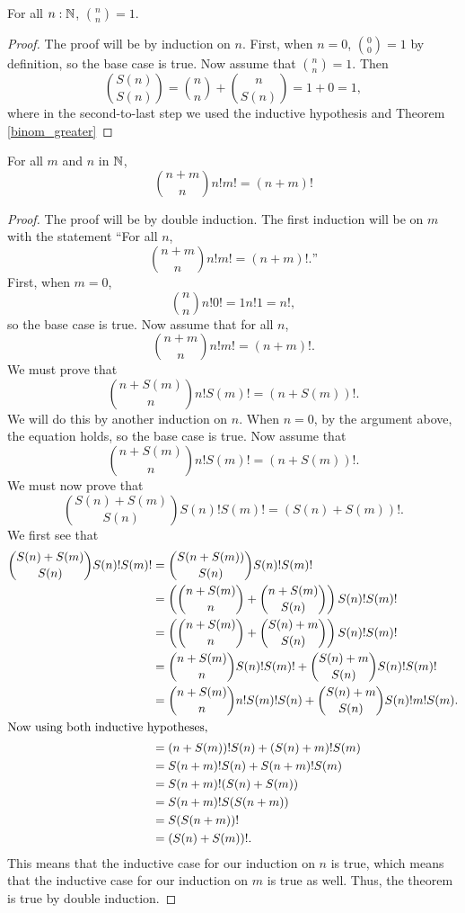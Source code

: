 \documentclass[../../math.tex]{subfiles}
\begin{document}
\begin{theorem}
    For all $n : \mathbb{N}$, $\displaystyle \binom{n}{n} = 1$.
\end{theorem}
\begin{proof}
    The proof will be by induction on $n$.  First, when $n = 0$, $\binom{0}{0} =
    1$ by definition, so the base case is true.  Now assume that $\binom{n}{n} =
    1$.  Then
    \[
        \binom{S(n)}{S(n)} = \binom{n}{n} + \binom{n}{S(n)} = 1 + 0 = 1,
    \]
    where in the second-to-last step we used the inductive hypothesis and
    Theorem \ref{binom_greater}
\end{proof}

\begin{theorem}
    For all $m$ and $n$ in $\mathbb{N}$,
    \[
        \binom{n + m}{n} n! m! = (n + m)!
    \]
\end{theorem}
\begin{proof}
    The proof will be by double induction.  The first induction will be on $m$
    with the statement ``For all $n$,
    \[
        \binom{n + m}{n} n! m! = (n + m)!.\text{''}
    \]
    First, when $m = 0$,
    \[
        \binom{n}{n} n! 0! = 1 n! 1 = n!,
    \]
    so the base case is true.  Now assume that for all $n$,
    \[
        \binom{n + m}{n} n! m! = (n + m)!.
    \]
    We must prove that
    \[
        \binom{n + S(m)}{n} n! S(m)! = (n + S(m))!.
    \]
    We will do this by another induction on $n$.  When $n = 0$, by the argument
    above, the equation holds, so the base case is true.  Now assume that
    \[
        \binom{n + S(m)}{n} n! S(m)! = (n + S(m))!.
    \]
    We must now prove that
    \[
        \binom{S(n) + S(m)}{S(n)} S(n)! S(m)! = (S(n) + S(m))!.
    \]
    We first see that
    \begin{align*}
        \binom{S(n) + S(m)}{S(n)} S(n)! S(m)! &=
            \binom{S(n + S(m))}{S(n)} S(n)! S(m)! \\
        &= \left( \binom{n + S(m)}{n} + \binom{n + S(m)}{S(n)} \right)
            S(n)! S(m)! \\
        &= \left( \binom{n + S(m)}{n} + \binom{S(n) + m}{S(n)} \right)
            S(n)! S(m)! \\
        &= \binom{n + S(m)}{n} S(n)! S(m)! +
            \binom{S(n) + m}{S(n)} S(n)! S(m)!  \\
        &= \binom{n + S(m)}{n} n! S(m)! S(n) +
            \binom{S(n) + m}{S(n)} S(n)! m! S(m). \\
    \intertext{Now using both inductive hypotheses,}
        &= (n + S(m))! S(n) + (S(n) + m)! S(m) \\
        &= S(n + m)! S(n) + S(n + m)! S(m) \\
        &= S(n + m)! (S(n) + S(m)) \\
        &= S(n + m)! S(S(n + m)) \\
        &= S(S(n + m))! \\
        &= (S(n) + S(m))!.
    \end{align*}
    This means that the inductive case for our induction on $n$ is true, which
    means that the inductive case for our induction on $m$ is true as well.
    Thus, the theorem is true by double induction.
\end{proof}
\end{document}
